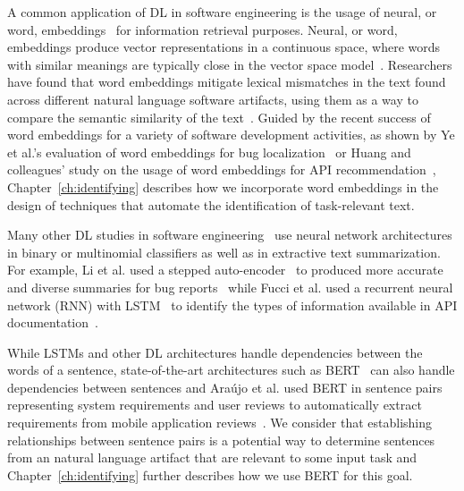 A common application of \acs{DL} in software engineering is the usage of neural, or word, embeddings~\cite{Mikolov2013}
for information retrieval purposes. 
Neural, or word, embeddings produce vector representations in a continuous space,
where words with similar meanings are typically close in the vector space model~\cite{harris1954distributional, mikolov2013efficient}. 
Researchers have found that word
embeddings mitigate lexical mismatches in the text found across different 
natural language software artifacts,
using them as a way to compare the semantic similarity of the text~\cite{mihalcea2006}.
Guided by the recent success of word embeddings 
for a variety of software development 
activities, as shown by Ye et al.'s evaluation of word embeddings
for bug localization~\cite{Ye2016}
or Huang and colleagues' study on 
the usage of word embeddings for API recommendation~\cite{Huang2018},
Chapter~\ref{ch:identifying} 
describes how we incorporate word embeddings in the 
design of techniques that automate the identification of task-relevant text. 







Many other \acs{DL} studies in software engineering~\cite{ferreira2021,li2018deep, watson2022}
use neural network architectures 
in binary or multinomial classifiers as well as in extractive text summarization.
For example, Li et al. used a stepped auto-encoder~\cite{aa}
to produced more accurate and diverse summaries 
for bug reports~\cite{li2018deep} while 
Fucci et al. used a 
recurrent neural network (\acs{RNN}) with 
\acf{LSTM}~\cite{aa}
to identify the types of information available in 
API documentation~\cite{fucci2019}.


While \acs{LSTM}s and other \acs{DL} architectures 
handle dependencies between the words of a sentence, 
state-of-the-art architectures such as \acf{BERT}~\cite{Devlin2018Bert}
can also handle dependencies between sentences
and Ara{\'u}jo et al. used \acs{BERT} in sentence pairs 
representing system requirements and user reviews 
to automatically extract requirements from 
mobile application reviews~\cite{Araujo2021}.
We consider that 
establishing relationships 
between sentence pairs is 
a potential way to determine 
sentences from an natural language artifact 
that are relevant to some input task 
and Chapter~\ref{ch:identifying}
further describes how 
we use \acs{BERT} for this goal.

